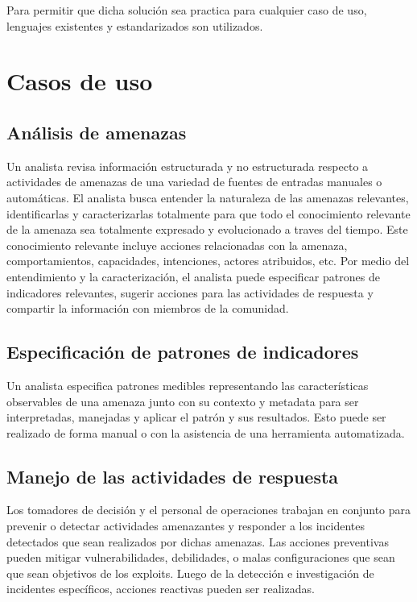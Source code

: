 Para permitir que dicha solución sea practica para cualquier caso de uso, 
lenguajes existentes y estandarizados son utilizados.

\section{Casos de uso}
\subsection{Análisis de amenazas}
Un analista revisa información estructurada y no estructurada respecto a 
actividades de amenazas de una variedad de fuentes de entradas manuales o 
automáticas. El analista busca entender la naturaleza de las amenazas 
relevantes, identificarlas y caracterizarlas totalmente para que todo el 
conocimiento relevante de la amenaza sea totalmente expresado y evolucionado a 
traves del tiempo. Este conocimiento relevante incluye acciones relacionadas con 
la amenaza, comportamientos, capacidades, intenciones, actores atribuidos, etc. 
Por medio del entendimiento y la caracterización, el analista puede especificar 
patrones de indicadores relevantes, sugerir acciones para las actividades de 
respuesta y compartir la información con miembros de la comunidad.

\subsection{Especificación de patrones de indicadores}
Un analista especifica patrones medibles representando las características 
observables de una amenaza junto con su contexto y metadata para ser 
interpretadas, manejadas y aplicar el patrón y sus resultados. Esto puede ser 
realizado de forma manual o con la asistencia de una herramienta automatizada.

\subsection{Manejo de las actividades de respuesta}
Los tomadores de decisión y el personal de operaciones trabajan en conjunto para 
prevenir o detectar actividades amenazantes y responder a los incidentes 
detectados que sean realizados por dichas amenazas. Las acciones preventivas 
pueden mitigar vulnerabilidades, debilidades, o malas configuraciones que sean 
que sean objetivos de los exploits. Luego de la detección e investigación de 
incidentes específicos, acciones reactivas pueden ser realizadas.

